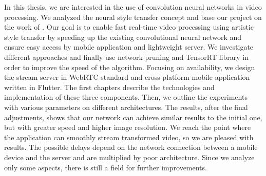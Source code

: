 \documentclass[../Main.tex]{subfiles}
\begin{document}
In this thesis, we are interested in the use of convolution neural networks in video processing. We analyzed the neural style transfer concept and base our project on the work of .
Our goal is to enable fast real-time video processing using artistic style transfer by speeding up the existing convolutional neural network and ensure easy access by mobile application and lightweight server.
We investigate different approaches and finally use network pruning and TensorRT library in order to improve the speed of the algorithm. Focusing on availability, we design the stream server in WebRTC standard and cross-platform mobile application written in Flutter. The first chapters describe the technologies and implementation of these three components. Then, we outline the experiments with various parameters on different architectures. 
The results, after the final adjustments, shows that our network can achieve similar results to the initial one, but with greater speed and higher image resolution. We reach the point where the application can smoothly stream transformed video, so we are pleased with results. The possible delays depend on the network connection between a mobile device and the server and are multiplied by poor architecture. Since we analyze only some aspects, there is still a field for further improvements.




\par\vspace*{\fill} %


\biblio %
\end{document}
